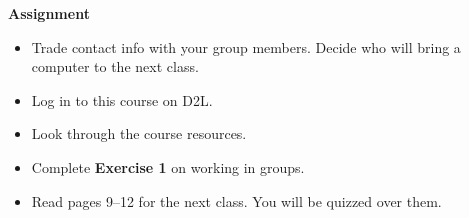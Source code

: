 {\bf Assignment}\\
\begin{itemize}
\item  Trade contact info with your group members.  Decide who will
  bring a computer to the next class.
\item   Log in to this course on D2L.
\item   Look through the course resources.
\item  Complete {\bf Exercise 1} on working in groups.
\item Read pages 9--12 for the next class. You will be quizzed over them.
\end{itemize}




  



